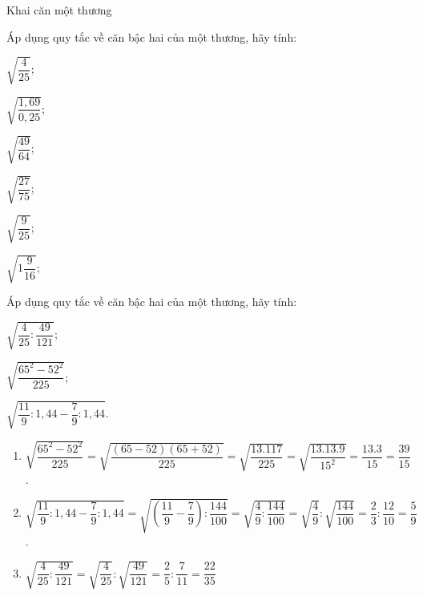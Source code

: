 \begin{dang}{Khai căn một thương}
\end{dang}
\begin{vd}
	Áp dụng quy tắc về căn bậc hai của một thương, hãy tính:
	\begin{listEX}[6]
	\item $\sqrt{\dfrac{4}{25}}$;
	\item $\sqrt{\dfrac{1{,}69}{0{,}25}}$;
	\item $\sqrt{\dfrac{49}{64}}$;
	\item $\sqrt{\dfrac{27}{75}}$;
	\item $\sqrt{\dfrac{9}{25}}$;
	\item $\sqrt{1 \dfrac{9}{16}}$;
	\end{listEX}
\end{vd}
\begin{vd}%
	Áp dụng quy tắc về căn bậc hai của một thương, hãy tính:
	\begin{listEX}[3]
	\item $
	\sqrt{\dfrac{4}{25}:\dfrac{49}{121}}$;
	\item $\sqrt{\dfrac{65^2 - 52^2}{225}}$;
	\item $\sqrt{\dfrac{11}{9}: 1{,}44 - \dfrac{7}{9}: 1{,}44}$.
	\end{listEX}
	\loigiai
	{
	\begin{enumerate}
	\item $\sqrt{\dfrac{65^2 - 52^2}{225}}=\sqrt{\dfrac{(65 - 52)(65 + 52)}{225}}=\sqrt{\dfrac{13.117}{225}}=\sqrt{\dfrac{13.13 .9}{15^2}}=\dfrac{13.3}{15}=\dfrac{39}{15}$.
	\item $\sqrt{\dfrac{11}{9}: 1,44 - \dfrac{7}{9}: 1,44}=\sqrt{\left(\dfrac{11}{9} - \dfrac{7}{9}\right) :\dfrac{144}{100}} =\sqrt{\dfrac{4}{9}:\dfrac{144}{100}}=\sqrt{\dfrac{4}{9}}:\sqrt{\dfrac{144}{100}}=\dfrac{2}{3}:\dfrac{12}{10}=\dfrac{5}{9}$.
	\item $ 
	\sqrt{\dfrac{4}{25}:\dfrac{49}{121}}=\sqrt{\dfrac{4}{25}}:\sqrt{\dfrac{49}{121}}=\dfrac{2}{5}:\dfrac{7}{11}=\dfrac{22}{35}
	$
	\end{enumerate}
	}
\end{vd}
